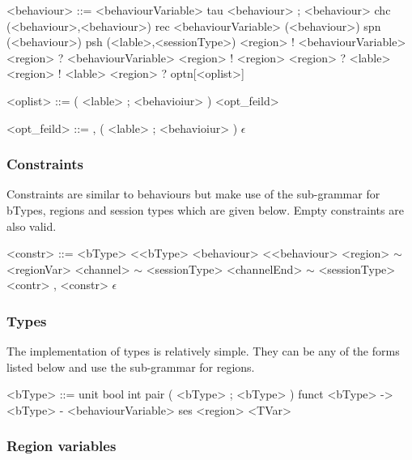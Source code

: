 \begin{grammar}
<behaviour> ::= <behaviourVariable>
\alt tau
\alt <behaviour> ; <behaviour>
\alt chc (<behaviour>,<behaviour>)
\alt rec <behaviourVariable> (<behaviour>)
\alt spn (<behaviour>)
\alt psh (<lable>,<sessionType>)
\alt <region> ! <behaviourVariable>
\alt <region> ? <behaviourVariable>
\alt <region> ! <region>
\alt <region> ? <lable>
\alt <region> ! <lable>
\alt <region> ? optn[<oplist>]

<oplist> ::= ( <lable> ; <behavioiur> ) <opt_feild>

<opt_feild> ::= , ( <lable> ; <behavioiur> )
\alt $\epsilon$

\end{grammar}

\subsubsection{Constraints}

Constraints are similar to behaviours but make use of the sub-grammar for bTypes, regions and session types which are given below. Empty constraints are also valid.

\begin{grammar}

<constr> ::= <bType> \textless <bType>
\alt <behaviour> \textless <behaviour>
\alt <region> $\sim$ <regionVar>
\alt <channel> $\sim$ <sessionType>
\alt <channelEnd> $\sim$ <sessionType>
\alt <contr> , <constr>
\alt $\epsilon$

\end{grammar}

\subsubsection{Types}

The implementation of types is relatively simple. They can be any of the forms listed below and use the sub-grammar for regions. 
\begin{grammar}

<bType> ::= unit
\alt bool 
\alt int
\alt pair ( <bType> ; <bType> )
\alt funct <bType> -\textgreater <bType> - <behaviourVariable>
\alt ses <region>
\alt <TVar>

\end{grammar}

\subsubsection {Region variables}

